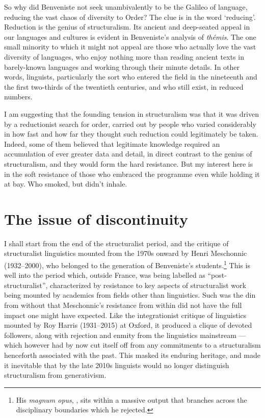 \documentclass[output=paper]{langscibook}
\begin{document}
So why did Benveniste not seek unambivalently to be the Galileo of language, reducing the vast chaos of diversity to Order? The clue is in the word ‘reducing’. Reduction is the genius of structuralism. Its ancient and deep-seated appeal in our languages and cultures is evident in Benveniste's analysis of \emph{thémis}. The one small minority to which it might not appeal are those who actually love the vast diversity of languages, who enjoy nothing more than reading ancient texts in barely-known languages and working through their minute details. In other words, linguists, particularly the sort who entered the field in the nineteenth and the first two-thirds of the twentieth centuries, and who still exist, in reduced numbers.

I am suggesting that the founding tension in structuralism was that it was driven by a reductionist search for order, carried out by people who varied considerably in how fast and how far they thought such reduction could legitimately be taken. Indeed, some of them believed that legitimate knowledge required an accumulation of ever greater data and detail, in direct contrast to the genius of structuralism, and they would form the hard resistance. But my interest here is in the soft resistance of those who embraced the programme even while holding it at bay. Who smoked, but didn’t inhale.

\section{The issue of discontinuity}
\label{sec:joseph:discontinuity}

I shall start from the end of the structuralist period, and the critique of structuralist linguistics mounted from the 1970s onward by Henri Meschonnic (1932--2000), who belonged to the generation of Benveniste's students.\footnote{His \emph{magnum opus}, \citet{Meschonnic1982}, sits within a massive output that branches across the disciplinary boundaries which he rejected.}  This is well into the period which, outside France, was being labelled as ``post-structuralist'', characterized by resistance to key aspects of structuralist work being mounted by academics from fields other than linguistics. Such was the din from without that Meschonnic's resistance from within did not have the full impact one might have expected. Like the integrationist critique of linguistics mounted by Roy Harris (1931--2015) at Oxford, it produced a clique of devoted followers, along with rejection and enmity from the linguistics mainstream — which however had by now cut itself off from any commitments to a structuralism henceforth associated with the past. This masked its enduring heritage, and made it inevitable that by the late 2010s linguists would no longer distinguish structuralism from generativism.
\end{document}

